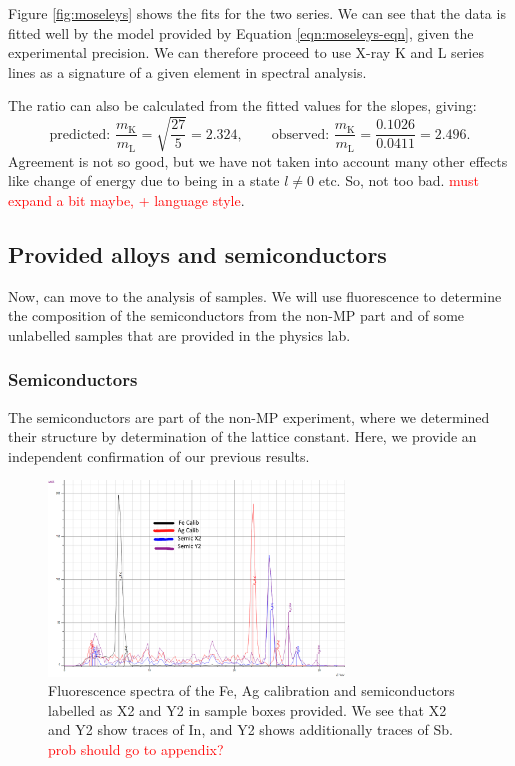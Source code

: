 \documentclass[11pt,a4paper,twoside,onecolumn]{article}
\newcommand{\reminder}[1]{\textcolor{red}{#1}}
\begin{document}
Figure \ref{fig:moseleys} shows the fits for the two series. We can see that the data is fitted well by the model provided by Equation \eqref{eqn:moseleys-eqn}, given the experimental precision. We can therefore proceed to use X-ray K and L series lines as a signature of a given element in spectral analysis.

The ratio can also be calculated from the fitted values for the slopes, giving:
\begin{equation}
    \text{predicted: }\frac{m_\mathrm{K}}{m_\mathrm{L}} = \sqrt{\frac{27}{5}} = 2.324,\qquad \text{observed: } \frac{m_\mathrm{K}}{m_\mathrm{L}} = \frac{0.1026}{0.0411} = 2.496.
\end{equation}
Agreement is not so good, but we have not taken into account many other effects like change of energy due to being in a state $l \neq 0$ etc. So, not too bad. \reminder{must expand a bit maybe, + language style}.

\subsection{Provided alloys and semiconductors}
Now, can move to the analysis of samples. We will use fluorescence to determine the composition of the semiconductors from the non-MP part and of some unlabelled samples that are provided in the physics lab.

\subsubsection{Semiconductors}
The semiconductors are part of the non-MP experiment, where we determined their structure by determination of the lattice constant. Here, we provide an independent confirmation of our previous results. 
\begin{figure}[!htbp]
    \centering
    \includegraphics[width=0.7\textwidth]{img/spect-semiconductors.png}
    \caption{Fluorescence spectra of the Fe, Ag calibration and semiconductors labelled as X2 and Y2 in sample boxes provided. We see that X2 and Y2 show traces of In, and Y2 shows additionally traces of Sb. \reminder{prob should go to appendix?}}
    \label{fig:spect-semiconductors}
\end{figure}
\end{document}
